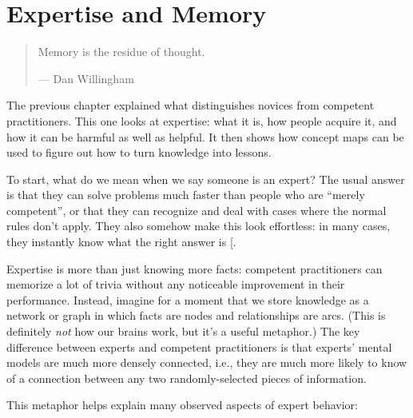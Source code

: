 \chapter{Expertise and Memory}\label{s:memory}

\begin{quote}\setlength{\parindent}{0pt}
Memory is the residue of thought.

--- Dan Willingham
\end{quote}

The previous chapter explained what distinguishes novices from competent
practitioners. This one looks at expertise: what it is, how people
acquire it, and how it can be harmful as well as helpful. It then shows
how concept maps can be used to figure out how to turn knowledge into
lessons.

To start, what do we mean when we say someone is an expert? The usual
answer is that they can solve problems much faster than people who are
``merely competent'', or that they can recognize and deal with cases
where the normal rules don't apply. They also somehow make this look
effortless: in many cases, they instantly know what the right answer is
{[}\protect[\hyperlink{b:Parn2017}{Parn2017}]{]}.

Expertise is more than just knowing more facts: competent practitioners
can memorize a lot of trivia without any noticeable improvement in their
performance. Instead, imagine for a moment that we store knowledge as a
network or graph in which facts are nodes and relationships are arcs.
(This is definitely \emph{not} how our brains work, but it's a useful
metaphor.) The key difference between experts and competent
practitioners is that experts' mental models are much more densely
connected, i.e., they are much more likely to know of a connection
between any two randomly-selected pieces of information.

This metaphor helps explain many observed aspects of expert behavior:

